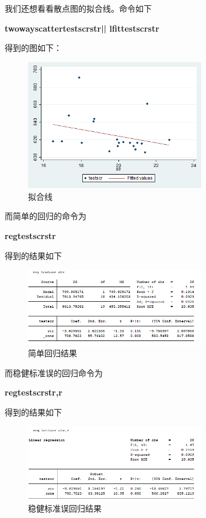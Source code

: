\documentclass[cn,12pt,math=newtx,citestyle=gb7714-2015,bibstyle=gb7714-2015]{elegantbook}
\begin{document}
	我们还想看看散点图的拟合线。命令如下
	
	\textbf{twoway\quad scatter\quad testscr\quad str\quad || lfit\quad testscr\quad str}
	
	得到的图如下：
	\begin{figure}[htbp]
		\centering
		\includegraphics[width=0.7\textwidth]{line.png}
		\caption{拟合线}\label{fig:digit}
	\end{figure}
	
	而简单的回归的命令为
	
	\textbf{reg\quad testscr\quad str}
	
	得到的结果如下
	\begin{figure}[htbp]
		\centering
		\includegraphics[width=0.7\textwidth]{reg.png}
		\caption{简单回归结果}\label{fig:digit}
	\end{figure}
	
	而稳健标准误的回归命令为
	
	\textbf{reg\quad testscr\quad str,r}
	
	得到的结果如下
	\begin{figure}[htbp]
		\centering
		\includegraphics[width=0.7\textwidth]{regr.png}
		\caption{稳健标准误回归结果}\label{fig:digit}
	\end{figure}
	
\end{document}
